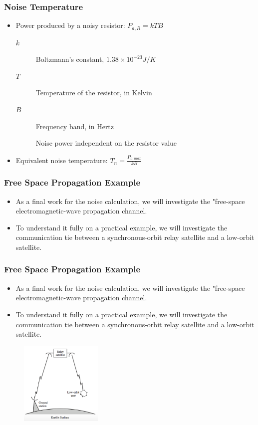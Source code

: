 \documentclass{beamer}
\begin{document}
\begin{frame}
	\frametitle{Noise Temperature}
	\begin{itemize}
		\item Power produced by a noisy resistor: $ P_{a,R} = kTB $
		\begin{description}
			\item[$k$] Boltzmann's constant, $ 1.38 \times 10^{-23} J/K $
			\item[$T$] Temperature of the resistor, in Kelvin
			\item[$B$] Frequency band, in Hertz
			\item[] Noise power independent on the resistor value
		\end{description}
		\item Equivalent noise temperature: $ T_n = \frac{P_{n,max}}{kB} $
	\end{itemize}
\end{frame}


\begin{frame}
	\frametitle{Free Space Propagation Example}
	\begin{itemize}
		\item As a final work for the noise calculation, we will investigate the "free-space electromagnetic-wave propagation channel.
		\item To understand it fully on a practical example, we will investigate the communication tie between a synchronous-orbit relay satellite and a low-orbit satellite.
	\end{itemize}
\end{frame}


\begin{frame}
	\frametitle{Free Space Propagation Example}
	\begin{itemize}
		\item As a final work for the noise calculation, we will investigate the "free-space electromagnetic-wave propagation channel.
		\item To understand it fully on a practical example, we will investigate the communication tie between a synchronous-orbit relay satellite and a low-orbit satellite.
	\end{itemize}
	\begin{figure}
		\includegraphics[width=0.35\textwidth]{Orbit.png}
	\end{figure}
\end{frame}
\end{document}
